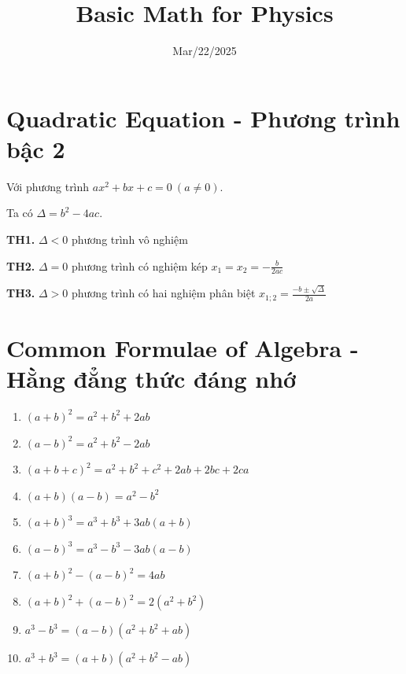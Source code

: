 \documentclass{article}
\begin{document}
\author{}
\title{Basic Math for Physics}
\date{Mar/22/2025}

\maketitle
\tableofcontents
\newpage

\section{Quadratic Equation - Phương trình bậc 2}

Với phương trình $ax^2 + bx + c = 0 \ (a \neq 0)$. \par

Ta có $\Delta = b^2 - 4ac$. \par

\textbf{TH1.} $\Delta < 0$ phương trình vô nghiệm \par

\textbf{TH2.} $\Delta = 0$ phương trình có nghiệm kép $x_1 = x_2 = -\frac{b}{2ac}$ \par

\textbf{TH3.} $\Delta > 0$ phương trình có hai nghiệm phân biệt $x_{1;2} = \frac{-b\pm \sqrt{\Delta}}{2a}$

\section{Common Formulae of Algebra - Hằng đẳng thức đáng nhớ}
\begin{enumerate}[label=(\roman*)]
	\item $(a+b)^2 = a^2 + b^2 + 2ab$
	\item $(a-b)^2 = a^2 + b^2 - 2ab$
	\item $(a+b+c)^2 = a^2 + b^2 + c^2 + 2ab + 2bc + 2ca$
	\item $(a+b)(a-b) = a^2 - b^2$
	\item $(a+b)^3 = a^3 + b^3 + 3ab(a+b)$
	\item $(a-b)^3 = a^3 - b^3 - 3ab(a-b)$
	\item $(a+b)^2 - (a-b)^2 = 4ab$
	\item $(a+b)^2 + (a-b)^2 = 2(a^2 + b^2)$
	\item $a^3 - b^3 = (a-b)(a^2 + b^2 + ab)$
	\item $a^3 + b^3 = (a+b)(a^2 + b^2 - ab)$
\end{enumerate}
\end{document}
